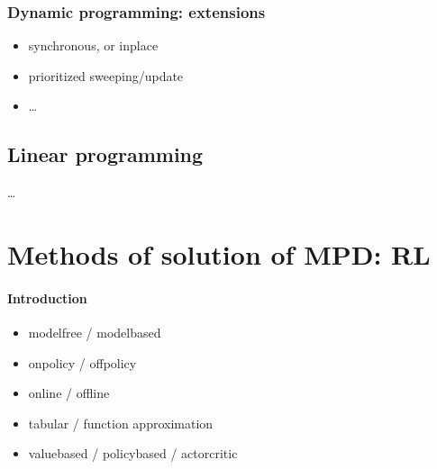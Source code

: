 \documentclass[letterpaper,10pt,english]{jupyterBook}
\begin{document}
\subsection{Dynamic programming: extensions}
\label{\detokenize{ch/rl/mdp_sol_dp_lp:dynamic-programming-extensions}}\label{\detokenize{ch/rl/mdp_sol_dp_lp:rl-mdp-sol-dp-extensions}}\begin{itemize}
\item {} 
\sphinxAtStartPar
synchronous, or in\sphinxhyphen{}place

\item {} 
\sphinxAtStartPar
prioritized sweeping/update

\item {} 
\sphinxAtStartPar
…

\end{itemize}


\section{Linear programming}
\label{\detokenize{ch/rl/mdp_sol_dp_lp:linear-programming}}\label{\detokenize{ch/rl/mdp_sol_dp_lp:rl-mdp-sol-lp}}
\sphinxAtStartPar
…

\sphinxstepscope


\chapter{Methods of solution of MPD: RL}
\label{\detokenize{ch/rl/mdp_sol_rl:methods-of-solution-of-mpd-rl}}\label{\detokenize{ch/rl/mdp_sol_rl:rl-mdp-sol-rl}}\label{\detokenize{ch/rl/mdp_sol_rl::doc}}\subsubsection*{Introduction}
\begin{itemize}
\item {} 
\sphinxAtStartPar
model\sphinxhyphen{}free / model\sphinxhyphen{}based

\item {} 
\sphinxAtStartPar
on\sphinxhyphen{}policy / off\sphinxhyphen{}policy

\item {} 
\sphinxAtStartPar
online / offline

\item {} 
\sphinxAtStartPar
tabular / function approximation

\item {} 
\sphinxAtStartPar
value\sphinxhyphen{}based / policy\sphinxhyphen{}based / actor\sphinxhyphen{}critic

\end{itemize}
\end{document}
